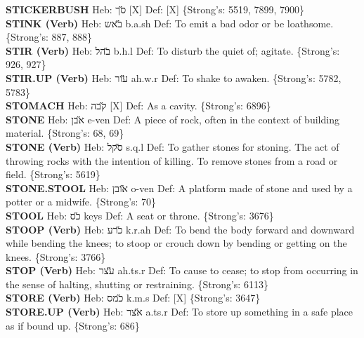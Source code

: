 {\textbf{STICKERBUSH} Heb: {\large\H סך} {[}X{]} Def: {[}X{]} \{Strong's: 5519, 7899, 7900\}\hfill{}\\

\textbf{STINK (Verb)} Heb: {\large\H באש} b.a.sh Def: To emit a bad odor or be loathsome. \{Strong's: 887, 888\}\hfill{}\\

\textbf{STIR (Verb)} Heb: {\large\H בהל} b.h.l Def: To disturb the quiet of; agitate. \{Strong's: 926, 927\}\hfill{}\\

\textbf{STIR.UP (Verb)} Heb: {\large\H עור} ah.w.r Def: To shake to awaken. \{Strong's: 5782, 5783\}\hfill{}\\

\textbf{STOMACH} Heb: {\large\H קבה} {[}X{]} Def: As a cavity. \{Strong's: 6896\}\hfill{}\\

\textbf{STONE} Heb: {\large\H אבן} e-ven Def: A piece of rock, often in the context of building material. \{Strong's: 68, 69\}\hfill{}\\

\textbf{STONE (Verb)} Heb: {\large\H סקל} s.q.l Def: To gather stones for stoning. The act of throwing rocks with the intention of killing. To remove stones from a road or field. \{Strong's: 5619\}\hfill{}\\

\textbf{STONE.STOOL} Heb: {\large\H אובן} o-ven Def: A platform made of stone and used by a potter or a midwife. \{Strong's: 70\}\hfill{}\\

\textbf{STOOL} Heb: {\large\H כס} keys Def: A seat or throne. \{Strong's: 3676\}\hfill{}\\

\textbf{STOOP (Verb)} Heb: {\large\H כרע} k.r.ah Def: To bend the body forward and downward while bending the knees; to stoop or crouch down by bending or getting on the knees. \{Strong's: 3766\}\hfill{}\\

\textbf{STOP (Verb)} Heb: {\large\H עצר} ah.ts.r Def: To cause to cease; to stop from occurring in the sense of halting, shutting or restraining. \{Strong's: 6113\}\hfill{}\\

\textbf{STORE (Verb)} Heb: {\large\H כמס} k.m.s Def: {[}X{]} \{Strong's: 3647\}\hfill{}\\

\textbf{STORE.UP (Verb)} Heb: {\large\H אצר} a.ts.r Def: To store up something in a safe place as if bound up. \{Strong's: 686\}\hfill{}\\

}
